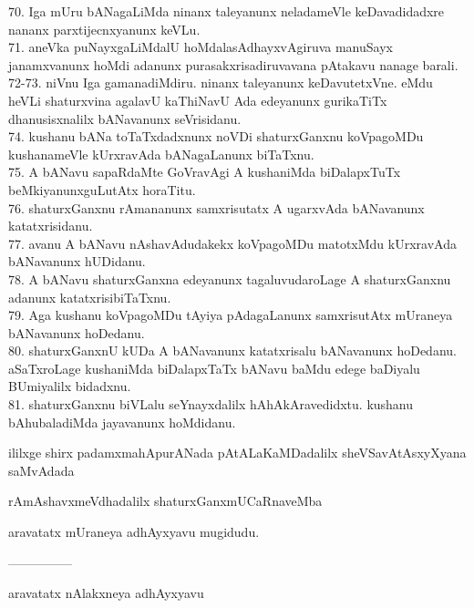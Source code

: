 \documentclass{article}
\begin{document}
70. Iga mUru bANagaLiMda ninanx taleyanunx neladameVle keDavadidadxre nananx parxtijecnxyanunx keVLu.\\
71. aneVka puNayxgaLiMdalU hoMdalasAdhayxvAgiruva manuSayx janamxvanunx hoMdi adanunx purasakxrisadiruvavana pAtakavu nanage barali.\\
72-73. niVnu Iga gamanadiMdiru. ninanx taleyanunx keDavutetxVne. eMdu heVLi shaturxvina agalavU kaThiNavU Ada edeyanunx gurikaTiTx dhanusisxnalilx bANavanunx seVrisidanu.\\
74. kushanu bANa toTaTxdadxnunx noVDi shaturxGanxnu koVpagoMDu kushanameVle kUrxravAda bANagaLanunx biTaTxnu.\\
75. A bANavu sapaRdaMte GoVravAgi A kushaniMda biDalapxTuTx beMkiyanunxguLutAtx horaTitu.\\
76. shaturxGanxnu rAmananunx samxrisutatx A ugarxvAda bANavanunx katatxrisidanu.\\
77. avanu A bANavu nAshavAdudakekx koVpagoMDu matotxMdu kUrxravAda bANavanunx hUDidanu.\\
78. A bANavu shaturxGanxna edeyanunx tagaluvudaroLage A shaturxGanxnu adanunx katatxrisibiTaTxnu.\\
79. Aga kushanu koVpagoMDu tAyiya pAdagaLanunx samxrisutAtx mUraneya bANavanunx hoDedanu.\\
80. shaturxGanxnU kUDa A bANavanunx katatxrisalu bANavanunx hoDedanu. aSaTxroLage kushaniMda biDalapxTaTx bANavu baMdu edege baDiyalu BUmiyalilx bidadxnu.\\
81. shaturxGanxnu biVLalu seYnayxdalilx hAhAkAravedidxtu. kushanu bAhubaladiMda jayavanunx hoMdidanu.\\

\begin{center}
ililxge shirx padamxmahApurANada pAtALaKaMDadalilx sheVSavAtAsxyXyana saMvAdada
\end{center}

\begin{center}
rAmAshavxmeVdhadalilx shaturxGanxmUCaRnaveMba
\end{center}

\begin{center}
aravatatx mUraneya adhAyxyavu mugidudu.
\end{center}

\begin{center}
---------------
\end{center}

\begin{center}
aravatatx nAlakxneya adhAyxyavu
\end{center}
\end{document}
